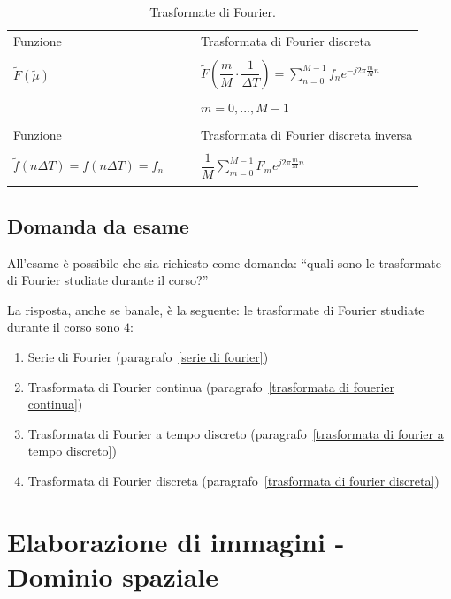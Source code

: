 \documentclass[a4paper]{article}
\newcommand{\dquotes}[1]{``#1''}
\begin{document}
\begin{table}[!htbp]
\begin{tabular}{@{} l l c l @{}}
			&&& \\
			\toprule
			Funzione & & & Trasformata di Fourier discreta \\
			\midrule
			&&& \\
			$\tilde{F}\left(\tilde{\mu}\right)$ &&& $\tilde{F}\left(\dfrac{m}{M} \cdot \dfrac{1}{\Delta T}\right) = \sum_{n = 0}^{M - 1} f_{n} e^{-j 2 \pi \frac{m}{M} n}$ \\
			&&& \\
			&&& $m = 0, ..., M - 1$ \\
			&&& \\
			\toprule
			Funzione & & & Trasformata di Fourier discreta inversa \\
			\midrule
			&&& \\
			$\tilde{f}\left(n \Delta T\right) = f\left(n \Delta T\right) = f_{n}$ &&& $\dfrac{1}{M} \sum_{m = 0}^{M - 1} F_{m} e^{j 2 \pi \frac{m}{M} n}$ \\
			&&& \\
			\bottomrule
		\end{tabular}
		\caption{Trasformate di Fourier.}
	\end{table}
	
	\newpage
	
	\subsection{Domanda da \textcolor{Red3}{esame}}
	
	All'esame è possibile che sia richiesto come domanda: \dquotes{quali sono le trasformate di Fourier studiate durante il corso?}
	
	La risposta, anche se banale, è la seguente: le trasformate di Fourier studiate durante il corso sono $4$:
	
	\begin{enumerate}[label=\Roman*.]
		\item Serie di Fourier (paragrafo~\ref{serie di fourier})
		\item Trasformata di Fourier continua (paragrafo~\ref{trasformata di fouerier continua})
		\item Trasformata di Fourier a tempo discreto (paragrafo~\ref{trasformata di fourier a tempo discreto})
		\item Trasformata di Fourier discreta (paragrafo~\ref{trasformata di fourier discreta})
	\end{enumerate}

	\newpage
	
	\section{Elaborazione di immagini - Dominio spaziale}
	
\end{document}
